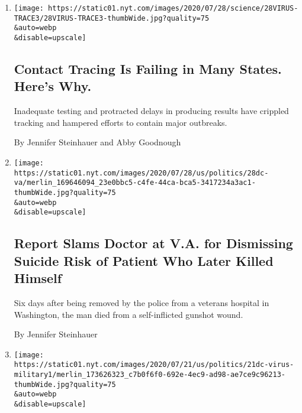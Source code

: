 \begin{enumerate}
\def\labelenumi{\arabic{enumi}.}
\item
  \href{/2020/07/31/health/covid-contact-tracing-tests.html}{}

  \texttt{[image: https://static01.nyt.com/images/2020/07/28/science/28VIRUS-TRACE3/28VIRUS-TRACE3-thumbWide.jpg?quality=75\\\&auto=webp\\\&disable=upscale]}

  \hypertarget{contact-tracing-is-failing-in-many-states-heres-why}{%
  \subsection{Contact Tracing Is Failing in Many States. Here's
  Why.}\label{contact-tracing-is-failing-in-many-states-heres-why}}

  Inadequate testing and protracted delays in producing results have
  crippled tracking and hampered efforts to contain major outbreaks.

  By Jennifer Steinhauer and Abby Goodnough
\item
  \href{/2020/07/28/us/politics/veterans-suicide.html}{}

  \texttt{[image: https://static01.nyt.com/images/2020/07/28/us/politics/28dc-va/merlin\_169646094\_23e0bbc5-c4fe-44ca-bca5-3417234a3ac1-thumbWide.jpg?quality=75\\\&auto=webp\\\&disable=upscale]}

  \hypertarget{report-slams-doctor-at-va-for-dismissing-suicide-risk-of-patient-who-later-killed-himself}{%
  \subsection{Report Slams Doctor at V.A. for Dismissing Suicide Risk of
  Patient Who Later Killed
  Himself}\label{report-slams-doctor-at-va-for-dismissing-suicide-risk-of-patient-who-later-killed-himself}}

  Six days after being removed by the police from a veterans hospital in
  Washington, the man died from a self-inflicted gunshot wound.

  By Jennifer Steinhauer
\item
  \href{/2020/07/21/us/politics/coronavirus-military.html}{}

  \texttt{[image: https://static01.nyt.com/images/2020/07/21/us/politics/21dc-virus-military1/merlin\_173626323\_c7b0f6f0-692e-4ec9-ad98-ae7ce9c96213-thumbWide.jpg?quality=75\\\&auto=webp\\\&disable=upscale]}

  \hypertarget{rise-in-virus-cases-near-bases-in-us-and-abroad-poses-test-for-military}{%
}
\end{enumerate}
